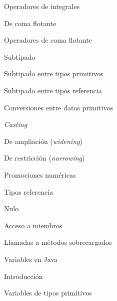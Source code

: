 \begin{longenum}
\begin{longenum}
\begin{longenum}
\begin{longenum}
                \begin{longenum}
                    \item Operadores de integrales
                \end{longenum}
                \item De coma flotante
                \begin{longenum}
                    \item Operadores de coma flotante
                \end{longenum}
                \item Subtipado
                \begin{longenum}
                    \item Subtipado entre tipos primitivos
                    \item Subtipado entre tipos referencia
                \end{longenum}
                \item Conversiones entre datos primitivos
                \begin{longenum}
                    \item \textit{Casting}
                    \item De ampliación (\textit{widening})
                    \item De restricción (\textit{narrowing})
                \end{longenum}
                \item Promociones numéricas
            \end{longenum}
            \item Tipos referencia
            \begin{longenum}
                \item Nulo
                \item Acceso a miembros
                \begin{longenum}
                    \item Llamadas a métodos sobrecargados
                \end{longenum}
            \end{longenum}
        \end{longenum}
        \item Variables en Java
        \begin{longenum}
            \item Introducción
            \item Variables de tipos primitivos

\end{longenum}
\end{longenum}
\end{longenum}
